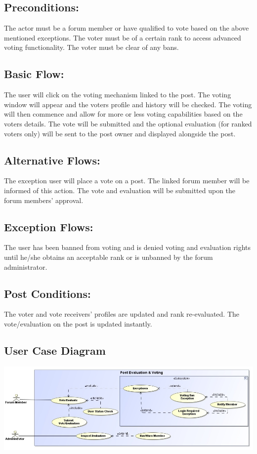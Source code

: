 \documentclass[12pt, oneside]{book}
\begin{document}
\subsection{Preconditions:} 
The actor must be a forum member or have qualified to vote based on the above mentioned exceptions. The voter must be of a certain rank to access advanced voting functionality. The voter must be clear of any bans. 
\subsection{Basic Flow:} 
The user will click on the voting mechanism linked to the post. The voting window will appear and the voters profile and history will be checked. The voting will then commence and allow for more or less voting capabilities based on the voters details. The vote will be submitted and the optional evaluation (for ranked voters only) will be sent to the post owner and displayed alongside the post.
\subsection{Alternative Flows:} 
The exception user will place a vote on a post. The linked forum member will be informed of this action. The vote and evaluation will be submitted upon the forum members’ approval. 
\subsection{Exception Flows:} 
The user has been banned from voting and is denied voting and evaluation rights until he/she obtains an acceptable rank or is unbanned by the forum administrator.
\subsection{Post Conditions:} 
The voter and vote receivers’ profiles are updated and rank re-evaluated. The vote/evaluation on the post is updated instantly. 
\subsection{User Case Diagram}
\begin{center}
\includegraphics[scale=0.4]{PostVoteAndEvaluation.png}
\end{center}
\end{document}
